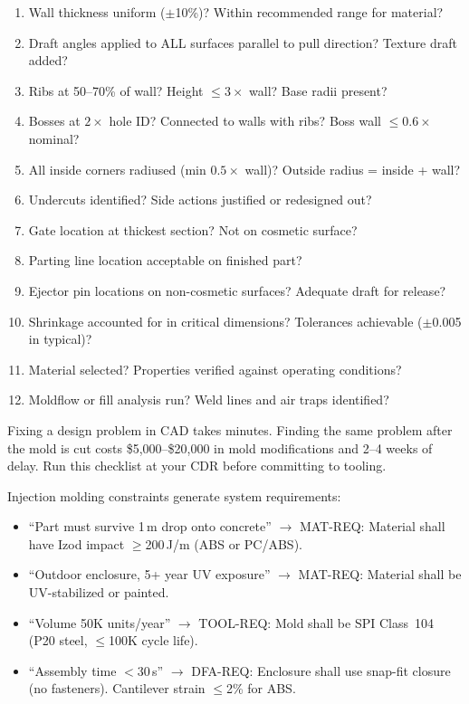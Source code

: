 \documentclass[11pt,letterpaper,twoside,openany]{book}
\begin{document}
\begin{enumerate}[leftmargin=1.5em]
  \item Wall thickness uniform ($\pm$10\%)? Within recommended range for material?
  \item Draft angles applied to ALL surfaces parallel to pull direction? Texture draft added?
  \item Ribs at 50--70\% of wall? Height $\leq 3\times$ wall? Base radii present?
  \item Bosses at $2\times$ hole ID? Connected to walls with ribs? Boss wall $\leq 0.6\times$ nominal?
  \item All inside corners radiused (min $0.5\times$ wall)? Outside radius = inside + wall?
  \item Undercuts identified? Side actions justified or redesigned out?
  \item Gate location at thickest section? Not on cosmetic surface?
  \item Parting line location acceptable on finished part?
  \item Ejector pin locations on non-cosmetic surfaces? Adequate draft for release?
  \item Shrinkage accounted for in critical dimensions? Tolerances achievable ($\pm$0.005\,in typical)?
  \item Material selected? Properties verified against operating conditions?
  \item Moldflow or fill analysis run? Weld lines and air traps identified?
\end{enumerate}

\begin{warningbox}
Fixing a design problem in CAD takes minutes. Finding the same problem after the mold is cut costs \$5,000--\$20,000 in mold modifications and 2--4 weeks of delay. Run this checklist at your CDR before committing to tooling.
\end{warningbox}

\begin{keyconceptbox}
Injection molding constraints generate system requirements:
\begin{itemize}[nosep,leftmargin=1.5em]
\item ``Part must survive 1\,m drop onto concrete'' $\to$ MAT-REQ: Material shall have Izod impact $\geq$200\,J/m (ABS or PC/ABS).
\item ``Outdoor enclosure, 5+ year UV exposure'' $\to$ MAT-REQ: Material shall be UV-stabilized or painted.
\item ``Volume 50K units/year'' $\to$ TOOL-REQ: Mold shall be SPI Class~104 (P20 steel, $\leq$100K cycle life).
\item ``Assembly time $<$30\,s'' $\to$ DFA-REQ: Enclosure shall use snap-fit closure (no fasteners). Cantilever strain $\leq$2\% for ABS.
\end{itemize}
\end{keyconceptbox}
\end{document}
